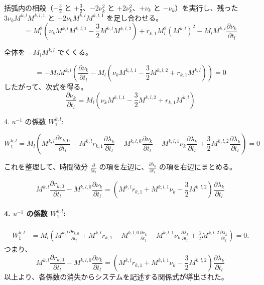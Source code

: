 \documentclass[paper=a4, fontsize=11pt]{jlreq} %
\theoremstyle{break}
\theoremstyle{qa}
\begin{document}
括弧内の相殺（$-\frac{3}{2}$ と $+\frac{3}{2}$、$-2\nu_k^2$ と $+2\nu_k^2$、$+\nu_k$ と $-\nu_k$）を実行し、残った $3\nu_k M^{k,l} M^{k,l,1}$ と $-2\nu_k M^{k,l} M^{k,l,1}$ を足し合わせる。
\begin{equation}
= M_l^2 \left( \nu_k M^{k,l} M^{k,l,1} - \frac{3}{2} M^{k,l} M^{k,l,2} \right) + r_{k,1} M_l^2 (M^{k,l})^2 - M_l M^{k,l} \frac{\partial \nu_k}{\partial t_l}
\end{equation}

全体を $-M_l M^{k,l}$ でくくる。

\begin{equation}
= - M_l M^{k,l} \left( \frac{\partial \nu_k}{\partial t_l} - M_l \left( \nu_k M^{k,l,1} - \frac{3}{2} M^{k,l,2} + r_{k,1} M^{k,l} \right) \right) = 0
\end{equation}
したがって、次式を得る。
\begin{equation}
\frac{\partial \nu_k}{\partial t_l} = M_l \left( \nu_k M^{k,l,1} - \frac{3}{2} M^{k,l,2} + r_{k,1} M^{k,l} \right)
\end{equation}

4. $u^{-1}$ の係数 $W_1^{k,l}$:

$$W_1^{k,l} = M_l \left( M^{k,l} \frac{\partial r_{k,0}}{\partial t_l} - M^{k,l} r_{k,1}\frac{\partial \lambda_{k}}{\partial t_l} - M^{k,l,0} \frac{\partial \nu_k}{\partial t_l} - M^{k,l,1} \nu_k \frac{\partial \lambda_k}{\partial t_l} + \frac{3}{2} M^{k,l,2} \frac{\partial \lambda_k}{\partial t_l} \right) = 0$$

これを整理して、時間微分 $\frac{\partial}{\partial t_l}$ の項を左辺に、$\frac{\partial \lambda_k}{\partial t_l}$ の項を右辺にまとめる。

$$M^{k,l} \frac{\partial r_{k,0}}{\partial t_l} - M^{k,l,0} \frac{\partial \nu_k}{\partial t_l} = \left(M^{k,l} r_{k,1} + M^{k,l,1} \nu_k  - \frac{3}{2} M^{k,l,2}\right) \frac{\partial \lambda_k}{\partial t_l}$$

\paragraph{4. $u^{-1}$ の係数 $W_1^{k,l}$:}
\begin{align*}
    W_1^{k,l} &= M_l \left( M^{k,l} \frac{\partial r_{k,0}}{\partial t_l} + M^{k,l} r_{k,1} - M^{k,l,0} \frac{\partial \nu_k}{\partial t_l} - M^{k,l,1} \nu_k \frac{\partial \lambda_k}{\partial t_l} + \frac{3}{2} M^{k,l,2} \frac{\partial \lambda_k}{\partial t_l} \right) = 0.
\end{align*}
つまり、
\begin{equation*}
M^{k,l} \frac{\partial r_{k,0}}{\partial t_l} - M^{k,l,0} \frac{\partial \nu_k}{\partial t_l} = \left(M^{k,l} r_{k,1} + M^{k,l,1} \nu_k  - \frac{3}{2} M^{k,l,2}\right) \frac{\partial \lambda_k}{\partial t_l}
\end{equation*}
以上より、各係数の消失からシステムを記述する関係式が導出された。
\end{document}
